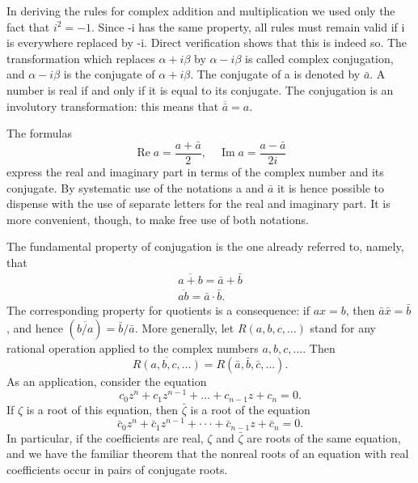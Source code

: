In deriving the rules for complex addition and multiplication we used only the fact that $i^{2} = -1$. Since -i has the same property, all rules must remain valid if i is everywhere replaced by -i. Direct verification shows that this is indeed so. The transformation which replaces $\alpha + i\beta$ by $\alpha - i\beta$ is called complex conjugation, and $\alpha - i\beta$ is the conjugate of $\alpha + i\beta$. The conjugate of a is denoted by $\bar{a}$. A number is real if and only if it is equal to its conjugate. The conjugation is an involutory transformation: this means that $\overline{\bar{a}} = a$.

The formulas
\begin{equation*}
\operatorname{Re} a = \frac {a + \bar {a}}{2}, \quad \operatorname{Im} a = \frac {a - \bar {a}}{2 i}
\end{equation*}
express the real and imaginary part in terms of the complex number and its conjugate. By systematic use of the notations a and $\bar{a}$ it is hence possible to dispense with the use of separate letters for the real and imaginary part. It is more convenient, though, to make free use of both notations.

The fundamental property of conjugation is the one already referred to, namely, that
\begin{equation*}
\begin{array}{r} \overline {{a + b}} = \bar {a} + \bar {b} \\ \overline {{a b}} = \bar {a} \cdot \bar {b}. \end{array}
\end{equation*}
The corresponding property for quotients is a consequence: if $ax = b$, then $\bar{a}\bar{x} = \bar{b}$, and hence $(\overline{b / a}) = \bar{b} / \bar{a}$. More generally, let $R(a,b,c,\ldots)$ stand for any rational operation applied to the complex numbers $a, b, c, \ldots$. Then
\begin{equation*}
\overline {{R (a , b , c , \dots)}} = R (\bar {a}, \bar {b}, \bar {c}, \dots).
\end{equation*}
As an application, consider the equation
\begin{equation*}
c _ {0} z ^ {n} + c _ {1} z ^ {n - 1} + \dots + c _ {n - 1} z + c _ {n} = 0.
\end{equation*}
If $\zeta$ is a root of this equation, then $\bar{\zeta}$ is a root of the equation
\begin{equation*}
\bar {c} _ {0} z ^ {n} + \bar {c} _ {1} z ^ {n - 1} + \cdot \cdot \cdot + \bar {c} _ {n - 1} z + \bar {c} _ {n} = 0.
\end{equation*}
In particular, if the coefficients are real, $\zeta$ and $\bar{\zeta}$ are roots of the same equation, and we have the familiar theorem that the nonreal roots of an equation with real coefficients occur in pairs of conjugate roots.

